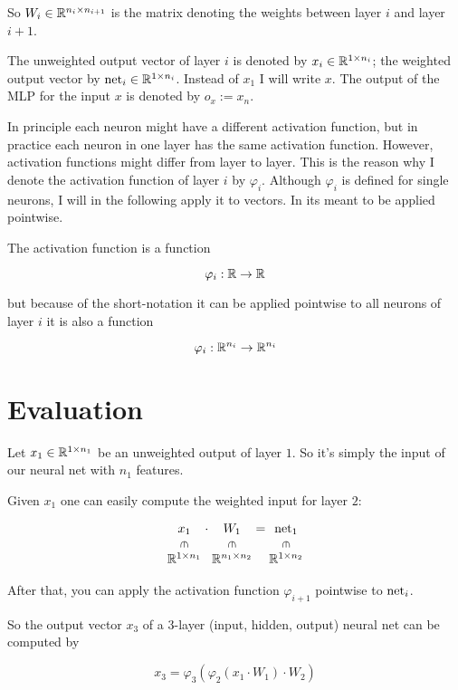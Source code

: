So $W_i \in \mathbb{R}^{n_i \times n_{i+1}}$ is the matrix denoting the weights between layer
$i$ and layer $i+1$.

The unweighted output vector of layer $i$ is denoted by $x_i \in \mathbb{R}^{1 \times n_i}$;
the weighted output vector by $\mathrm{net}_i \in \mathbb{R}^{1 \times n_i}$. Instead of $x_1$ I
will write $x$.
The output of the \gls{MLP} for the input $x$ is denoted by $o_x:= x_n$.

In principle each neuron might have a different activation function, but in
practice each neuron in one layer has the same activation function. However,
activation functions might differ from layer to layer. This is the reason why
I denote the activation function of layer $i$ by $\varphi_i$. Although $\varphi_i$
is defined for single neurons, I will in the following apply it to vectors. In
its meant to be applied pointwise.

The activation function is a function 

\[\varphi_i: \mathbb{R} \rightarrow \mathbb{R} \]

but because of the short-notation it can be applied pointwise to all neurons
of layer $i$ it is also a function

\[\varphi_i: \mathbb{R}^{n_{i}} \rightarrow \mathbb{R}^{n_{i}}\]

\section{Evaluation}
Let $x_1 \in \mathbb{R}^{1 \times n_1}$ be an unweighted output of layer $1$. So it's
simply the input of our neural net with $n_1$ features.

Given $x_1$ one can easily compute the weighted input for layer $2$:

\[
\begin{array}{@{}c@{\;}c@{\;}c@{\;}c@{\;}c@{}}
x_1 & \cdot & W_{1} & = & \net_1 \\
\vin && \vin && \vin \\
\mathbb{R}^{1\times n_1} && \mathbb{R}^{n_1\times n_2} && \mathbb{R}^{1\times n_2}
\end{array}
\]

After that, you can apply the activation function $\varphi_{i+1}$ pointwise
to $\mathrm{net}_i$. %

So the output vector $x_3$ of a 3-layer (input, hidden, output) neural net can be
computed by

\[x_3 = \varphi_3(\varphi_2(x_1 \cdot W_{1}) \cdot W_{2})\]

